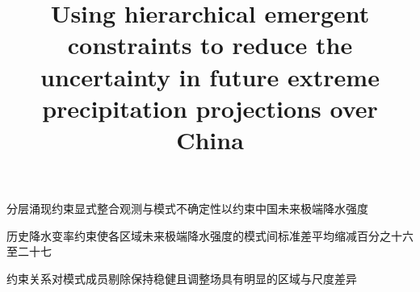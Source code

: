 \documentclass[draft]{agujournal2019}
\begin{document}
\title{Using hierarchical emergent constraints to reduce the uncertainty in future extreme precipitation projections over China}
\begin{keypoints}
\item 分层涌现约束显式整合观测与模式不确定性以约束中国未来极端降水强度
\item 历史降水变率约束使各区域未来极端降水强度的模式间标准差平均缩减百分之十六至二十七
\item 约束关系对模式成员剔除保持稳健且调整场具有明显的区域与尺度差异
\end{keypoints}
\end{document}
